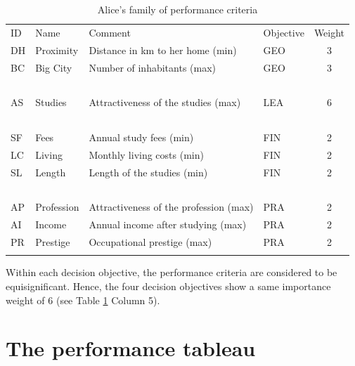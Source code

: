 \begin{table}[h]
\caption{Alice's family of performance criteria}
\label{tab:12.2}       %
\begin{center}
    \begin{tabular}{l|l|l|l|c}
      \hline\noalign{\smallskip}
      ID & Name & Comment & Objective & Weight\\
      \noalign{\smallskip}\hline\noalign{\smallskip}
       DH  & Proximity  &  Distance in km to her home (min)      &   GEO    &     3\\
       BC  & Big City   &  Number of inhabitants (max)           &   GEO    &     3\\
       \   & \          &  \                                     &   \      &     \ \\
       AS  & Studies    &  Attractiveness of the studies (max)   &   LEA    &     6\\
       \   & \          &  \                                     &  \       &    \ \\
       SF  & Fees       &  Annual study fees (min)               &   FIN    &     2\\
       LC  & Living     &  Monthly living costs (min)            &   FIN    &     2\\
       SL  & Length     &  Length of the studies (min)           &   FIN    &     2\\
       \   &  \         &   \                                    &   \      &     \ \\
       AP  & Profession &  Attractiveness of the profession (max)&   PRA    &     2\\
       AI  & Income     &  Annual income after studying (max)    &   PRA    &     2\\
       PR  & Prestige   &  Occupational prestige (max)           &   PRA    &     2\\
      \noalign{\smallskip}\hline
    \end{tabular}
\end{center}
\end{table}

Within each decision objective, the performance criteria are considered to be equisignificant. Hence, the four decision objectives show a same importance weight of 6 (see Table \ref{tab:12.2} Column 5).

\section{The performance tableau}
\label{sec:12.2}

